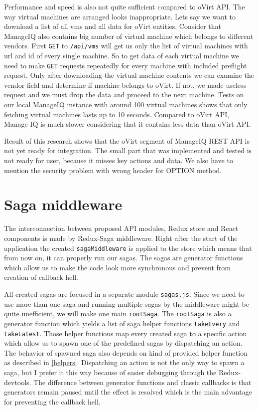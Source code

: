 Performance and speed is also not quite sufficient compared to oVirt API. The way virtual machines are arranged looks inappropriate. Lets say we want to download a list of all vms and all data for oVirt entities. Consider that ManageIQ also contains big number of virtual machine which belongs to different vendors. First \texttt{GET} to \texttt{/api/vms} will get us only the list of virtual machines with url and id of every single machine. So to get data of each virtual machine we need to make \texttt{GET} requests repeatedly for every machine with included preflight request. Only after downloading the virtual machine contents we can examine the vendor field and determine if machine belongs to oVirt. If not, we made useless request and we must drop the data and proceed to the next machine. Tests on our local ManageIQ instance with around 100 virtual machines shows that only fetching virtual machines lasts up to 10 seconds. Compared to oVirt API, Manage IQ is much slower considering that it contains less data than oVirt API.  

Result of this research shows that the oVirt segment of ManageIQ REST API is not yet ready for integration. The small part that was implemented and tested is not ready for user, because it misses key actions and data. We also have to mention the security problem with wrong header for OPTION method.

\section{Saga middleware}
The interconnection between proposed API modules, Redux store and React components is made by Redux-Saga middleware. Right after the start of the application the created \texttt{sagaMiddleware} is applied to the store which means that from now on, it can properly run our sagas. The sagas are generator functions which allow us to make the code look more synchronous and prevent from creation of callback hell.

All created sagas are focused in a separate module \texttt{sagas.js}. Since we need to use more than one saga and running multiple sagas by the middleware might be quite unefficient, we will make one main \texttt{rootSaga}. The \texttt{rootSaga} is also a generator function which yields a list of saga helper functions \texttt{takeEvery} and \texttt{takeLatest}. Those helper functions map every created saga to a specific action which allow us to spawn one of the predefined sagas by dispatching an action. The behavior of spawned saga also depends on kind of provided helper function as described in \ref{helpers}. Dispatching an action is not the only way to spawn a saga, but I prefer it this way because of easier debugging through the Redux-devtools. The difference between generator functions and classic callbacks is that generators remain paused until the effect is resolved which is the main advantage for preventing the callback hell.

